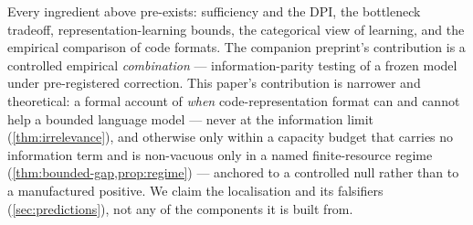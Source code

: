 Every ingredient above pre-exists: sufficiency and the DPI, the bottleneck
tradeoff, representation-learning bounds, the categorical view of learning, and
the empirical comparison of code formats. The companion preprint's contribution is
a controlled empirical \emph{combination} --- information-parity testing of a
frozen model under pre-registered correction. This paper's contribution is
narrower and theoretical: a formal account of \emph{when} code-representation
format can and cannot help a bounded language model --- never at the information
limit (\cref{thm:irrelevance}), and otherwise only within a capacity budget that
carries no information term and is non-vacuous only in a named finite-resource
regime (\cref{thm:bounded-gap,prop:regime}) --- anchored to a controlled null
rather than to a manufactured positive. We claim the localisation and its
falsifiers (\cref{sec:predictions}), not any of the components it is built from.
